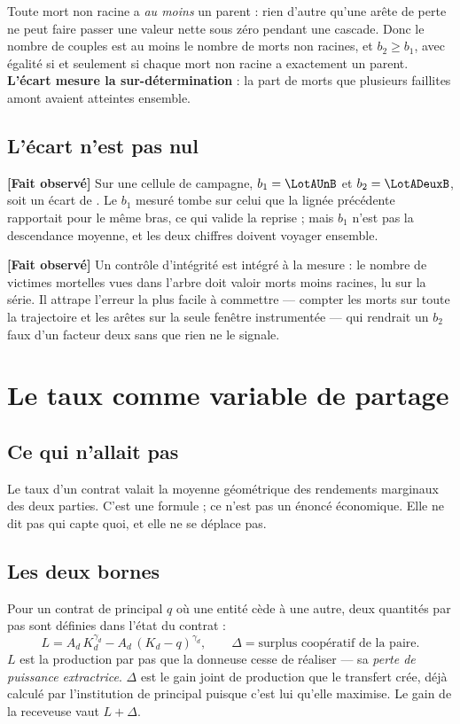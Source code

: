 \documentclass[11pt,a4paper]{article}
\newcommand{\fait}{\textbf{[Fait observé]}}
\begin{document}
Toute mort non racine a \emph{au moins} un parent : rien d'autre qu'une arête
de perte ne peut faire passer une valeur nette sous zéro pendant une cascade.
Donc le nombre de couples est au moins le nombre de morts non racines, et
$b_2 \ge b_1$, avec égalité si et seulement si chaque mort non racine a
exactement un parent. \textbf{L'écart mesure la sur-détermination} : la part
de morts que plusieurs faillites amont avaient atteintes ensemble.

\subsection{L'écart n'est pas nul}

\fait{} Sur une cellule de campagne, $b_1 = \LotAUnB$ et $b_2 = \LotADeuxB$,
soit un écart de \LotAEcartB. Le $b_1$ mesuré tombe sur celui que la lignée
précédente rapportait pour le même bras, ce qui valide la reprise ; mais
$b_1$ n'est pas la descendance moyenne, et les deux chiffres doivent voyager
ensemble.

\fait{} Un contrôle d'intégrité est intégré à la mesure : le nombre de
victimes mortelles vues dans l'arbre doit valoir morts moins racines, lu sur
la série. Il attrape l'erreur la plus facile à commettre --- compter les
morts sur toute la trajectoire et les arêtes sur la seule fenêtre
instrumentée --- qui rendrait un $b_2$ faux d'un facteur deux sans que rien
ne le signale.

\section{Le taux comme variable de partage}

\subsection{Ce qui n'allait pas}

Le taux d'un contrat valait la moyenne géométrique des rendements marginaux
des deux parties. C'est une formule ; ce n'est pas un énoncé économique. Elle
ne dit pas qui capte quoi, et elle ne se déplace pas.

\subsection{Les deux bornes}

Pour un contrat de principal $q$ où une entité cède à une autre, deux
quantités par pas sont définies dans l'état du contrat :
\[
L = A_d\,K_d^{\gamma_d} - A_d\,(K_d - q)^{\gamma_d},
\qquad
\Delta = \text{surplus coopératif de la paire.}
\]
$L$ est la production par pas que la donneuse cesse de réaliser --- sa
\emph{perte de puissance extractrice}. $\Delta$ est le gain joint de
production que le transfert crée, déjà calculé par l'institution de principal
puisque c'est lui qu'elle maximise. Le gain de la receveuse vaut $L + \Delta$.
\end{document}
